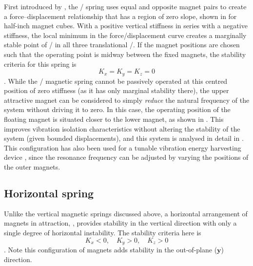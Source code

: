 \documentclass[11pt,a4paper]{memoir}
\begin{document}
First introduced by \textcite{nijsse2001}, the \qzs/ spring uses equal and opposite magnet pairs to create a force--displacement relationship that has a region of zero slope, shown in  for half-inch magnet cubes.
With a positive vertical stiffness in series with a negative stiffness, the local minimum in the force/displacement curve creates a marginally stable point of \qzs/ in all three translational \dof/.
If the magnet positions are chosen such that the operating point is midway between the fixed magnets, the stability criteria for this spring is
\begin{dmath}[compact]
  K_x=K_y=K_z=0
\end{dmath}.
While the \qzs/ magnetic spring cannot be passively operated at this centred position of zero stiffness (as it has only marginal stability there), the upper attractive magnet can be considered to simply \emph{reduce} the natural frequency of the system without driving it to zero.
In this case, the operating position of the floating magnet is situated closer to the lower magnet, as shown in .
This improves vibration isolation characteristics without altering the stability of the system (given bounded displacements), and this system is analysed in detail in .
This configuration has also been used for a tunable vibration energy harvesting device \cite{challa2008}, since the resonance frequency can be adjusted by varying the positions of the outer magnets.

\begin{figure}
\end{figure}


\subsection{Horizontal spring}

Unlike the vertical magnetic springs discussed above, a horizontal arrangement of magnets in attraction, , provides stability in the vertical direction with only a single degree of horizontal instability.
The stability criteria here is
\begin{dmath}[compact]
K_x<0,\quad K_y>0, \quad K_z>0
\end{dmath}.
Note this configuration of magnets adds stability in the out-of-plane ($\mathbf y$) direction.
\end{document}
